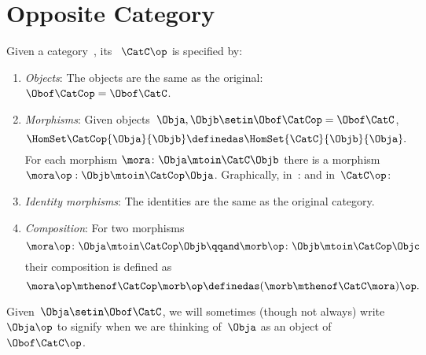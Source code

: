 
\section{Opposite Category}

\begin{ctdefinition}
    \label{def:opposite-category}
    \label{def:oppositecat}
    Given a category~\CatC, its \emph{}~$\CatC\op$ is specified by:
    \begin{enumerate}
        \item \emph{Objects}: The objects are the same as the original: $\Obof\CatCop = \Obof\CatC$.

        \item \emph{Morphisms}: Given objects~$\Obja,  \Objb \setin \Obof\CatCop = \Obof\CatC$,
              \begin{equation}
                  \label{eq:homset-op-cat}
                  \HomSet\CatCop{\Obja}{\Objb} \definedas \HomSet{\CatC}{\Objb}{\Obja}.
              \end{equation}
              For each morphism $\mora\colon\Obja\mtoin\CatC\Objb$ there is a morphism
              $\mora\op:\Objb\mtoin\CatCop\Obja$.
              Graphically, in~\CatC:
              and in~$\CatC\op$:
        \item \emph{Identity morphisms}: The identities are the same as the original category.
        \item \emph{Composition}: For two morphisms
              \begin{equation}
                  \mora\op\colon \Obja \mtoin\CatCop \Objb
                  \qqand
                  \morb\op\colon \Objb \mtoin\CatCop \Objc
              \end{equation}
              their composition is defined as 
              \begin{equation}
                  \mora\op \mthenof\CatCop \morb\op \definedas (\morb \mthenof\CatC \mora)\op.
              \end{equation}
    \end{enumerate}
\end{ctdefinition}
Given~$\Obja \setin  \Obof\CatC$, we will sometimes (though not always) write $\Obja\op$ to signify when we are thinking of~$\Obja$ as an object of~$\Obof\CatC\op$.


